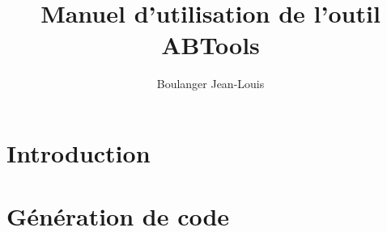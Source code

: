 \documentclass[10pt,a4paper]{article}
\author{Boulanger Jean-Louis}
\title{Manuel d'utilisation de l'outil ABTools}
\begin{document}
\section*{Introduction}
\section{G\'en\'eration de code}
\end{document}
